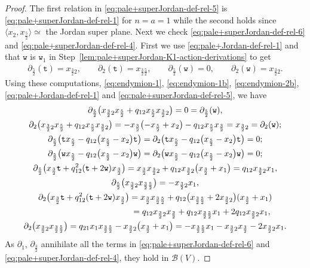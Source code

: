 \documentclass[pdftex]{sigma}
\numberwithin{equation}{section}
\newcommand{\toba}{\mathscr B}
\newcommand{\ttt}{\mathtt{t}}
\newcommand{\wt}{\mathtt{w}}
\newcommand{\tresdos}{\frac{3}{2}}
\newcommand{\cincodos}{\frac{5}{2}}
\begin{document}
\begin{proof}
The first relation in \eqref{eq:pale+superJordan-def-rel-5} is \eqref{eq:pale+superJordan-def-rel-1} for $n=a=1$ while the second holds since
$\big\langle x_{2}, x_{\cincodos}\big\rangle \simeq $ the Jordan super plane.
Next we check \eqref{eq:pale+superJordan-def-rel-6} and \eqref{eq:pale+superJordan-def-rel-4}.
First we use \eqref{eq:pale+Jordan-def-rel-1} and that $\wt$ is $\wt_1$ in Step~\ref{lem:pale+superJordan-K1-action-derivations} to get
\begin{gather*}
\partial_{\cincodos}(\ttt)=x_{\tresdos2},\qquad
\partial_{2}(\ttt)=x_{\tresdos\cincodos},\qquad
\partial_{\cincodos}(\wt)=0,\qquad
\partial_{2}(\wt)=x_{\tresdos2}.
\end{gather*}
Using these computations, \eqref{eq:endymion-1}, \eqref{eq:endymion-1b}, \eqref{eq:endymion-2b}, \eqref{eq:pale+Jordan-def-rel-1} and \eqref{eq:pale+superJordan-def-rel-5}, we have
\begin{gather*}
\partial_{\cincodos} \big(x_{\tresdos2}x_{\cincodos} +q_{12}x_{\cincodos}x_{\tresdos2}\big) = 0 = \partial_{\cincodos}(\wt),
\\
\partial_{2} \big(x_{\tresdos2}x_{\cincodos} +q_{12}x_{\cincodos}x_{\tresdos2}\big) = -x_{\tresdos}\bigl(-x_{\cincodos}+x_2\bigr) -q_{12}x_{\cincodos}x_{\tresdos}=x_{\tresdos2}=\partial_{2}(\wt);
\\
\partial_{\cincodos} \big(\ttt x_{\cincodos} -q_{12}\big(x_{\cincodos}-x_{2}\big)\ttt\big) =
\partial_{2} \big(\ttt x_{\cincodos} -q_{12}\big(x_{\cincodos}-x_{2}\big)\ttt\big) = 0;
\\
\partial_{\cincodos} \big(\wt x_{\cincodos}-q_{12}\big(x_{\cincodos}-x_{2}\big)\wt\big) =
\partial_{2} \big(\wt x_{\cincodos}-q_{12}\big(x_{\cincodos}-x_{2}\big)\wt\big) =0;
\\
\partial_{\cincodos} \big(x_{\tresdos}\ttt +q_{12}^2(\ttt+2\wt)x_{\tresdos}\big) = x_{\tresdos}x_{\tresdos2} +q_{12}x_{\tresdos2}\big(x_{\tresdos}+x_1\big)
= q_{12}x_{\tresdos2}x_1,
\\
\partial_{\cincodos} \big(x_{\tresdos2}x_{\tresdos\cincodos}\big) = -x_{\tresdos2}x_1,
\\
\partial_{2} \big(x_{\tresdos}\ttt +q_{12}^2(\ttt+2\wt)x_{\tresdos}\big) = x_{\tresdos}x_{\tresdos\cincodos} +q_{12}\big(x_{\tresdos\cincodos}+2x_{\tresdos2}\big)(x_{\tresdos}+x_1)
\\ \hphantom{\partial_{2} \big(x_{\tresdos}\ttt +q_{12}^2(\ttt+2\wt)x_{\tresdos}\big)}
{}= q_{12}x_{\tresdos2}x_{\tresdos}+q_{12}x_{\tresdos\cincodos}x_1+2q_{12}x_{\tresdos2}x_1,
\\
\partial_{2} \big(x_{\tresdos2}x_{\tresdos\cincodos}\big) = q_{21}x_1x_{\tresdos\cincodos}-x_{\tresdos2}\big(x_{\tresdos}+x_1\big)
=-x_{\tresdos\cincodos}x_1 -x_{\tresdos2}x_{\tresdos}-2x_{\tresdos2}x_1.
\end{gather*}
As $\partial_1$, $\partial_{\tresdos}$ annihilate all the terms in \eqref{eq:pale+superJordan-def-rel-6} and \eqref{eq:pale+superJordan-def-rel-4}, they hold in $\toba(V)$.


\end{proof}
\end{document}
